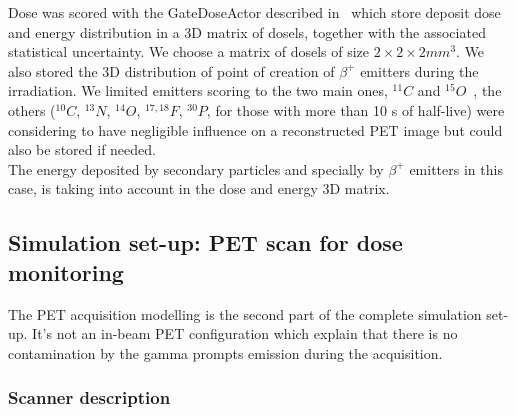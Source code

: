 \documentclass[11pt]{iopart}
\begin{document}
Dose was scored with the GateDoseActor described in~\cite{Jan2010,Sarrut2008} which store deposit dose and energy distribution in a 3D matrix of dosels, together with the associated statistical uncertainty. We choose a matrix of dosels of size $2\times 2 \times 2 mm^3$. 
We also stored the 3D distribution of point of creation of $\beta^+$ emitters during the irradiation. We limited emitters scoring to the two main ones, $^{11}C$ and $^{15}O$~\cite{Pshenichnov2007}, the others ($^{10}C$, $^{13}N$, $^{14}O$, $^{17,18}F$, $^{30}P$, for those with more than 10 s of half-live) were considering to have negligible influence on a reconstructed PET image but could also be stored if needed.\\ 
The energy deposited by secondary particles and specially by $\beta^+$ emitters in this case, is taking into account in the dose and energy 3D matrix.



\subsection{Simulation set-up: PET scan for dose monitoring}

The PET acquisition modelling is the second part of the complete simulation set-up. It's not an in-beam PET configuration which explain that there is no contamination by the gamma prompts emission during the acquisition.

\subsubsection{Scanner description}
\end{document}
